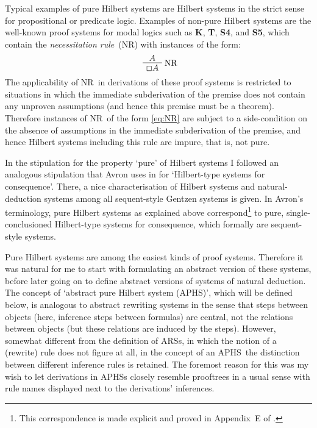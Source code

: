 \documentclass[envcountsame,runningheads]{llncs}
\newcommand{\APHS}{A\hspace*{-0.3pt}P\hspace*{-0.6pt}H\hspace*{-0.4pt}S}
\newcommand{\aform}{A}
\newcommand{\modlogicK}{{\bf K}}
\newcommand{\modlogicT}{{\bf T}}
\newcommand{\modlogicSfour}{{\bf S4}}
\newcommand{\modlogicSfive}{{\bf S5}}
\newcommand{\Necessitation}{{\normalfont NR}}
\newcommand{\necessite}[1]{{\Box{#1}}} \newcommand{\figpath}{figs}
\begin{document}
Typical examples of pure Hilbert systems are Hilbert systems
in the strict sense for propositional or predicate logic. 
Examples of non-pure Hilbert systems are the well-known
proof systems for modal logics such as 
\modlogicK, \modlogicT, \modlogicSfour, and \modlogicSfive,
which contain the \emph{necessitation rule}~(\Necessitation)
with instances of the form:
\begin{equation}
  \label{eq:NR}
\mbox{
    \AxiomC{$ \aform $}
    \RightLabel{\Necessitation}
    \UnaryInfC{$ \necessite{\aform} $}
    \DisplayProof
       }
\end{equation}
The applicability of \Necessitation\
in derivations of these proof systems is restricted to situations
in which the immediate subderivation of the premise 
does not contain any unproven assumptions 
(and hence this premise must be a theorem).
Therefore instances of \Necessitation~of the form \eqref{eq:NR} 
are subject to a side-condition on the absence
of assumptions in the immediate subderivation of the premise,  
and hence Hilbert systems including this rule are impure, that is, not pure.

In the stipulation for the property `pure' of Hilbert systems I followed
an analogous stipulation that Avron uses in \cite{avro:1991} for 
`Hilbert-type systems for consequence'.
There, a nice characterisation of Hilbert systems and
natural-deduction systems among all sequent-style Gentzen systems is given.
In Avron's terminology, 
pure Hilbert systems as explained above correspond\footnote{This correspondence is made explicit and proved in
            Appendix~E of \cite{grab:2003}.}
to pure, single-conclusioned 
Hilbert-type systems for consequence, which formally are sequent-style systems.

Pure Hilbert systems are among the easiest kinds of proof systems.
Therefore it was natural for me to start with formulating 
an abstract version of these systems, before later going on to define 
abstract versions of systems of natural deduction. 
The concept of `abstract pure Hilbert system (\APHS)', 
which will be defined below,
is analogous to abstract rewriting systems in the sense that steps
between objects (here, inference steps between formulas) are central, not
the relations between objects (but these relations are induced by the steps).
However, somewhat different from the definition of ARSs,
in which the notion of a (rewrite) rule does not figure at
all, in the concept of an \APHS\ the distinction between different
inference rules is retained. The foremost reason for this was 
my wish to let derivations in \APHS{s} closely resemble
prooftrees in a usual sense with rule names displayed next
to the derivations' inferences. 
\end{document}
